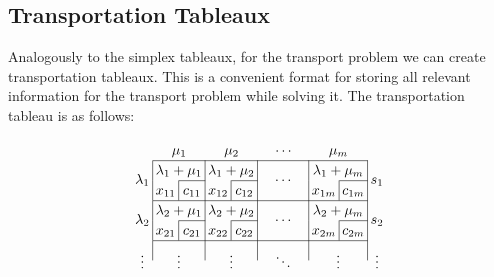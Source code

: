 \subsection{Transportation Tableaux}
Analogously to the simplex tableaux, for the transport problem we can create transportation tableaux.
This is a convenient format for storing all relevant information for the transport problem while solving it.
The transportation tableau is as follows:

\[
	\arraycolsep=2pt\def\arraystretch{1.2}
	\begin{array}{c|c|c|c|c|c|c|c|c|c}
		\multicolumn{1}{c}{}           & \multicolumn{2}{c}{\mu_1}                        & \multicolumn{2}{c}{\mu_2}                        & \multicolumn{2}{c}{\cdots}                       & \multicolumn{2}{c}{\mu_m}                        & \multicolumn{1}{c}{}                                                         \\\cline{2-9}
		\multirow{2}{*}{\(\lambda_1\)} & \multicolumn{2}{c|}{\lambda_1 + \mu_1}           & \multicolumn{2}{c|}{\lambda_1 + \mu_2}           & \multicolumn{2}{c|}{\multirow{2}{*}{\(\cdots\)}} & \multicolumn{2}{c|}{\lambda_1 + \mu_m}           & \multirow{2}{*}{\(s_1\)}                                                     \\\cline{3-3}\cline{5-5}\cline{9-9}
		                               & \multicolumn{1}{c|}{x_{11}}                      & c_{11}                                           & \multicolumn{1}{c|}{x_{12}}                      & c_{12}                                           & \multicolumn{2}{c|}{\ \;\qquad\;\ } & \multicolumn{1}{c|}{x_{1m}} & c_{1m} & \\\cline{2-9}
		\multirow{2}{*}{\(\lambda_2\)} & \multicolumn{2}{c|}{\lambda_2 + \mu_1}           & \multicolumn{2}{c|}{\lambda_2 + \mu_2}           & \multicolumn{2}{c|}{\multirow{2}{*}{\(\cdots\)}} & \multicolumn{2}{c|}{\lambda_2 + \mu_m}           & \multirow{2}{*}{\(s_2\)}                                                     \\\cline{3-3}\cline{5-5}\cline{9-9}
		                               & \multicolumn{1}{c|}{x_{21}}                      & c_{21}                                           & \multicolumn{1}{c|}{x_{22}}                      & c_{22}                                           & \multicolumn{2}{c|}{}               & \multicolumn{1}{c|}{x_{2m}} & c_{2m} & \\\cline{2-9}
		\multirow{2}{*}{\(\vdots\)}    & \multicolumn{2}{c|}{\multirow{2}{*}{\(\vdots\)}} & \multicolumn{2}{c|}{\multirow{2}{*}{\(\vdots\)}} & \multicolumn{2}{c|}{\multirow{2}{*}{\(\ddots\)}} & \multicolumn{2}{c|}{\multirow{2}{*}{\(\vdots\)}} & \multirow{2}{*}{\(\vdots\)}                                                  \\

\end{array}\]

